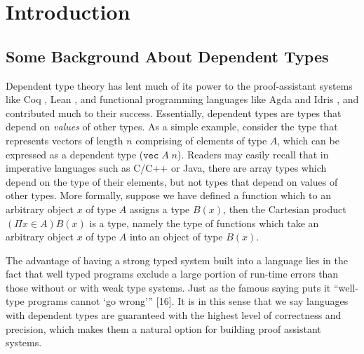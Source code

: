 \chapter{Introduction}
\section{Some Background About Dependent Types}
Dependent type theory has lent much of its power to the proof-assistant systems like Coq \cite{huet1997coq}, Lean \cite{de2015lean}, and functional programming languages like Agda \cite{norell2008dependently} and Idris \cite{brady2013idris}, and contributed much to their success. Essentially, dependent types are types that depend on \emph{values} of other types. As a simple example, consider the type that represents vectors of length $n$ comprising of elements of type $A$, which can be expressed as a dependent type ($\texttt{vec}\; A\; n$). Readers may easily recall that in imperative languages such as C/C++ or Java, there are array types which depend on the type of their elements, but not types that depend on values of other types. More formally, suppose we have defined a function which to an arbitrary object $x$ of type $A$ assigns a type $B(x)$, then the Cartesian product $(\Pi x \in A)B(x)$ is a type, namely the type of functions which take an arbitrary object $x$ of type $A$ into an object of type $B(x)$.

The advantage of having a strong typed system built into a language lies in the fact that well typed programs exclude a large portion of run-time errors than those without or with weak type systems. Just as the famous saying puts it “well-type programs cannot ‘go wrong’” [16]. It is in this sense that we say languages with dependent types are guaranteed with the highest level of correctness and precision, which makes them a natural option for building proof assistant systems.

